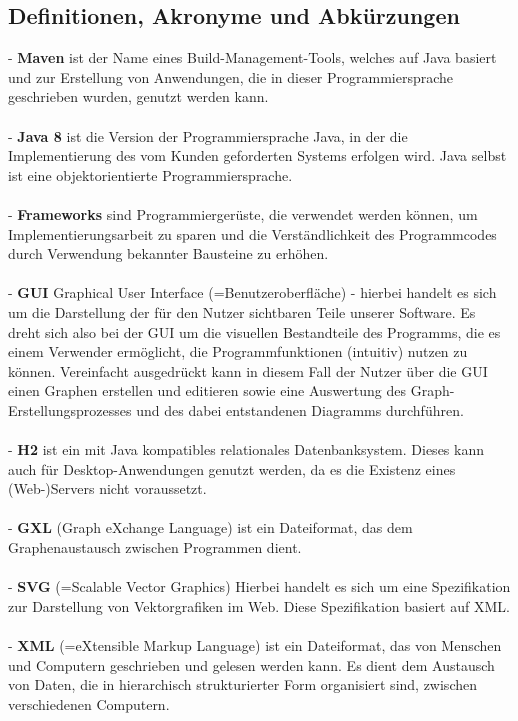 \documentclass[enabledeprecatedfontcommands,fontsize=11pt,paper=a4,twoside]{scrartcl}
\newcounter{one}
\begin{document}
	\subsection{Definitionen, Akronyme und Abkürzungen}
	\label{sec:daa}
	- \textbf{Maven} ist der Name eines Build-Management-Tools, welches auf Java basiert und zur Erstellung von Anwendungen, die in dieser Programmiersprache geschrieben wurden, genutzt werden kann. \\ \\
	- \textbf{Java 8} ist die Version der Programmiersprache Java, in der die Implementierung des vom Kunden geforderten Systems erfolgen wird. Java selbst ist eine objektorientierte Programmiersprache. \\ \\
	- \textbf{Frameworks} sind Programmiergerüste, die verwendet werden können, um Implementierungsarbeit zu sparen und die Verständlichkeit des Programmcodes durch Verwendung bekannter Bausteine zu erhöhen. \\ \\
	- \textbf{GUI} Graphical User Interface (=Benutzeroberfläche) - hierbei handelt es sich um die Darstellung der für den Nutzer sichtbaren Teile unserer Software. Es dreht sich also bei der GUI um die visuellen Bestandteile des Programms, die es einem Verwender ermöglicht, die Programmfunktionen (intuitiv) nutzen zu können. Vereinfacht ausgedrückt kann in diesem Fall der Nutzer über die GUI einen Graphen erstellen und editieren sowie eine Auswertung des Graph-Erstellungsprozesses und des dabei entstandenen Diagramms durchführen. \\ \\
	- \textbf{H2} ist ein mit Java kompatibles relationales Datenbanksystem. Dieses kann auch für Desktop-Anwendungen genutzt werden, da es die Existenz eines (Web-)Servers nicht voraussetzt.\\ \\
	- \textbf{GXL} (Graph eXchange Language) ist ein Dateiformat, das dem Graphenaustausch zwischen Programmen dient. \\ \\
	- \textbf{SVG} (=Scalable Vector Graphics) Hierbei handelt es sich um eine Spezifikation zur Darstellung von Vektorgrafiken im Web. Diese Spezifikation basiert auf XML.  \\ \\
	- \textbf{XML} (=eXtensible Markup Language) ist ein Dateiformat, das von Menschen und Computern geschrieben und gelesen werden kann. Es dient dem Austausch von Daten, die in hierarchisch strukturierter Form organisiert sind, zwischen verschiedenen Computern. \\ \\
\end{document}
